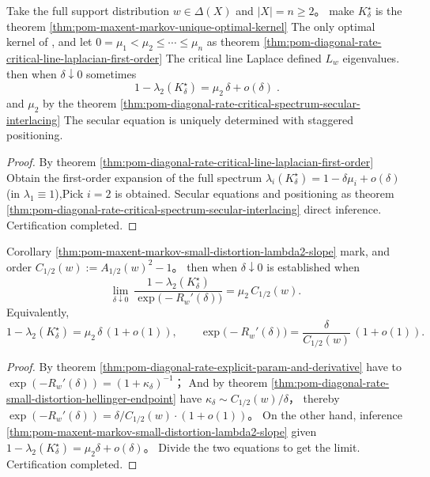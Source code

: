 \begin{corollary}\label{thm:pom-maxent-markov-small-distortion-lambda2-slope}
Take the full support distribution \(w\in\Delta(X)\) and \(|X|=n\ge 2\)。
make \(K^\star_\delta\) is the theorem \ref{thm:pom-maxent-markov-unique-optimal-kernel} The only optimal kernel of , and let
\(
0=\mu_1<\mu_2\le\cdots\le\mu_n
\)
as theorem \ref{thm:pom-diagonal-rate-critical-line-laplacian-first-order} The critical line Laplace defined \(L_w\) eigenvalues.
then when \(\delta\downarrow 0\) sometimes
\[
\boxed{\;
1-\lambda_2(K^\star_\delta)=\mu_2\,\delta+o(\delta)\; }.
\]
and \(\mu_2\) by the theorem \ref{thm:pom-diagonal-rate-critical-spectrum-secular-interlacing} The secular equation is uniquely determined with staggered positioning.
\end{corollary}
\begin{proof}
By theorem \ref{thm:pom-diagonal-rate-critical-line-laplacian-first-order} Obtain the first-order expansion of the full spectrum
\(
\lambda_i(K^\star_\delta)=1-\delta\mu_i+o(\delta)
\)
(in \(\lambda_1\equiv 1\)),Pick \(i=2\) is obtained.
Secular equations and positioning as theorem \ref{thm:pom-diagonal-rate-critical-spectrum-secular-interlacing} direct inference. Certification completed.
\end{proof}

\begin{corollary}\label{cor:pom-maxent-markov-gap-vs-rate-slope-coupling}
Corollary \ref{thm:pom-maxent-markov-small-distortion-lambda2-slope} mark, and order
\(
C_{1/2}(w):=A_{1/2}(w)^2-1
\)。
then when \(\delta\downarrow 0\) is established when
\[
\lim_{\delta\downarrow 0}\ \frac{1-\lambda_2(K^\star_\delta)}{\exp\bigl(-R_w'(\delta)\bigr)}
=\mu_2\,C_{1/2}(w).
\]
Equivalently,
\[
1-\lambda_2(K^\star_\delta)=\mu_2\,\delta\,(1+o(1)),
\qquad
\exp\bigl(-R_w'(\delta)\bigr)=\frac{\delta}{C_{1/2}(w)}\,(1+o(1)).
\]
\end{corollary}
\begin{proof}
By theorem \ref{thm:pom-diagonal-rate-explicit-param-and-derivative} have to
\(
\exp(-R_w'(\delta))=(1+\kappa_\delta)^{-1}
\)；
And by theorem \ref{thm:pom-diagonal-rate-small-distortion-hellinger-endpoint} have \(\kappa_\delta\sim C_{1/2}(w)/\delta\)，
thereby \(\exp(-R_w'(\delta))=\delta/C_{1/2}(w)\cdot(1+o(1))\)。
On the other hand, inference \ref{thm:pom-maxent-markov-small-distortion-lambda2-slope} given
\(
1-\lambda_2(K^\star_\delta)=\mu_2\delta+o(\delta)
\)。
Divide the two equations to get the limit. Certification completed.
\end{proof}

